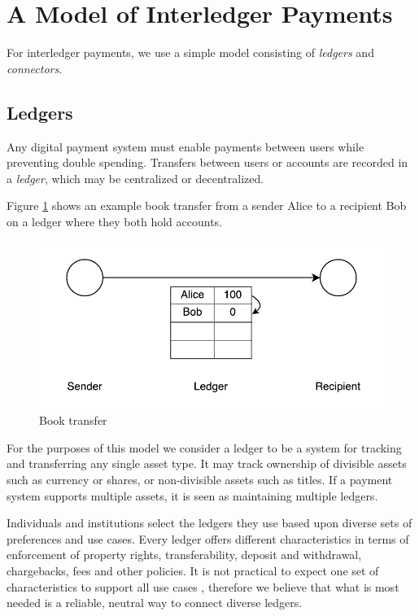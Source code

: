 \documentclass[letterpaper,twocolumn,10pt]{article}
\begin{document}
\section{A Model of Interledger Payments}

For interledger payments, we use a simple model consisting of \textit{ledgers} and \textit{connectors}.
                 
\subsection{Ledgers}

Any digital payment system must enable payments between users while preventing double spending. Transfers between users or accounts are recorded in a \textit{ledger}, which may be centralized or decentralized. \cite{Bitcoin}

Figure \ref{fig:three-bells} shows an example book transfer from a sender Alice to a recipient Bob on a ledger where they both hold accounts.

\begin{figure}[ht]
    \centering
    \includegraphics[width=\columnwidth]{figures/three-bells.pdf}
    \caption{Book transfer}
    \label{fig:three-bells}
\end{figure}

For the purposes of this model we consider a ledger to be a system for tracking and transferring any single asset type. It may track ownership of divisible assets such as currency or shares, or non-divisible assets such as titles. If a payment system supports multiple assets, it is seen as maintaining multiple ledgers.

Individuals and institutions select the ledgers they use based upon diverse sets of preferences and use cases. Every ledger offers different characteristics in terms of enforcement of property rights, transferability, deposit and withdrawal, chargebacks, fees and other policies. It is not practical to expect one set of characteristics to support all use cases \cite{back2014enabling}, therefore we believe that what is most needed is a reliable, neutral way to connect diverse ledgers.
\end{document}
